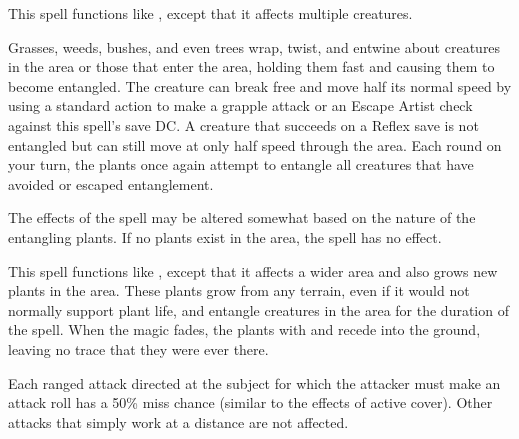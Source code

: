 \spellrng{\rngmed}
\begin{spelleffect}
  This spell functions like , except that it affects multiple creatures.
\end{spelleffect}

\spellrng{\rngmed}
\begin{spelleffect}
  Grasses, weeds, bushes, and even trees wrap, twist, and entwine about creatures in the area or those that enter the area, holding them fast and causing them to become entangled. The creature can break free and move half its normal speed by using a standard action to make a grapple attack or an Escape Artist check against this spell's save DC. A creature that succeeds on a Reflex save is not entangled but can still move at only half speed through the area. Each round on your turn, the plants once again attempt to entangle all creatures that have avoided or escaped entanglement.
\end{spelleffect}
\begin{spellnotes}
  The effects of the spell may be altered somewhat based on the nature of the entangling plants. If no plants exist in the area, the spell has no effect.
\end{spellnotes}

\begin{spelleffect}
  This spell functions like , except that it affects a wider area and also grows new plants in the area. These plants grow from any terrain, even if it would not normally support plant life, and entangle creatures in the area for the duration of the spell. When the magic fades, the plants with and recede into the ground, leaving no trace that they were ever there.
\end{spelleffect}

\spellrng{\rngclose}
\begin{spelleffect}
  Each ranged attack directed at the subject for which the attacker must make an attack roll has a 50\% miss chance (similar to the effects of active cover). Other attacks that simply work at a distance are not affected.
\end{spelleffect}

